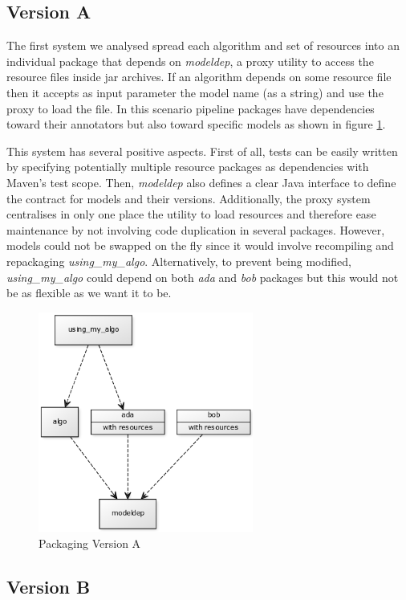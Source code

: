 \documentclass{article}
\newcommand{\id}[1]{\mbox{\textit{#1}}}
\begin{document}
\subsection{Version A}

The first system we analysed spread each algorithm and set of resources into an individual package that depends on \id{modeldep}, a proxy utility to access the resource files inside jar archives. If an algorithm depends on some resource file then it accepts as input parameter the model name (as a string) and use the proxy to load the file. In this scenario pipeline packages have dependencies toward their annotators but also toward specific models as shown in figure \ref{fig:pkgsysA}.

This system has several positive aspects. First of all, tests can be easily written by specifying potentially multiple resource packages as dependencies with Maven's test scope. Then, \id{modeldep} also defines a clear Java interface to define the contract for models and their versions. Additionally, the proxy system centralises in only one place the utility to load resources and therefore ease maintenance by not involving code duplication in several packages. However, models could not be swapped on the fly since it would involve recompiling and repackaging \id{using\_my\_algo}.  Alternatively, to prevent being modified, \id{using\_my\_algo} could depend on both \id{ada} and \id{bob} packages but this would not be as flexible as we want it to be.

\begin{figure}
\centering
\includegraphics[width=200pt]{res/packaging_version_A.png}
\caption{Packaging Version A}
\label{fig:pkgsysA}
\end{figure}


\subsection{Version B}
\end{document}
